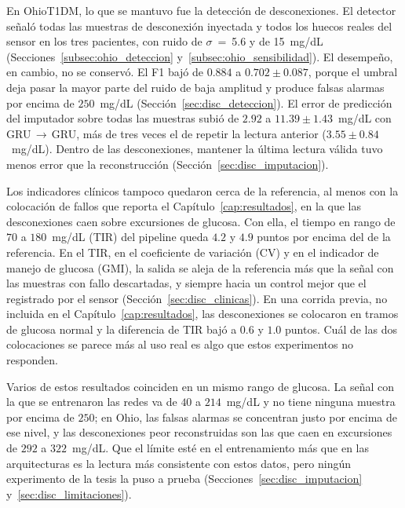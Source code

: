 \documentclass{report}
\begin{document}
En OhioT1DM, lo que se mantuvo fue la detección de desconexiones. El detector señaló todas las muestras de desconexión inyectada y todos los huecos reales del sensor en los tres pacientes, con ruido de $\sigma$~=~5.6 y de 15~mg/dL (Secciones~\ref{subsec:ohio_deteccion} y~\ref{subsec:ohio_sensibilidad}). El desempeño, en cambio, no se conservó. El F1 bajó de $0.884$ a $0.702 \pm 0.087$, porque el umbral deja pasar la mayor parte del ruido de baja amplitud y produce falsas alarmas por encima de $250$~mg/dL (Sección~\ref{sec:disc_deteccion}). El error de predicción del imputador sobre todas las muestras subió de $2.92$ a $11.39 \pm 1.43$~mg/dL con GRU\,$\rightarrow$\,GRU, más de tres veces el de repetir la lectura anterior ($3.55 \pm 0.84$~mg/dL). Dentro de las desconexiones, mantener la última lectura válida tuvo menos error que la reconstrucción (Sección~\ref{sec:disc_imputacion}).
 
Los indicadores clínicos tampoco quedaron cerca de la referencia, al menos con la colocación de fallos que reporta el Capítulo~\ref{cap:resultados}, en la que las desconexiones caen sobre excursiones de glucosa. Con ella, el tiempo en rango de $70$ a $180$~mg/dL (TIR) del pipeline queda $4.2$ y $4.9$ puntos por encima del de la referencia. En el TIR, en el coeficiente de variación (CV) y en el indicador de manejo de glucosa (GMI), la salida se aleja de la referencia más que la señal con las muestras con fallo descartadas, y siempre hacia un control mejor que el registrado por el sensor (Sección~\ref{sec:disc_clinicas}). En una corrida previa, no incluida en el Capítulo~\ref{cap:resultados}, las desconexiones se colocaron en tramos de glucosa normal y la diferencia de TIR bajó a $0.6$ y $1.0$ puntos. Cuál de las dos colocaciones se parece más al uso real es algo que estos experimentos no responden.
 
Varios de estos resultados coinciden en un mismo rango de glucosa. La señal con la que se entrenaron las redes va de $40$ a $214$~mg/dL y no tiene ninguna muestra por encima de $250$; en Ohio, las falsas alarmas se concentran justo por encima de ese nivel, y las desconexiones peor reconstruidas son las que caen en excursiones de $292$ a $322$~mg/dL. Que el límite esté en el entrenamiento más que en las arquitecturas es la lectura más consistente con estos datos, pero ningún experimento de la tesis la puso a prueba (Secciones~\ref{sec:disc_imputacion} y~\ref{sec:disc_limitaciones}).
 
\end{document}
